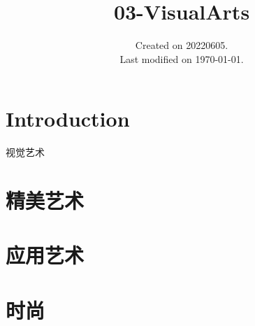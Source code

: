 \documentclass[UTF8]{../RepresentationUniverse}
\begin{document}
\title{03-VisualArts}
\date{Created on 20220605.\\   Last modified on \today.}
\maketitle
\tableofcontents


\chapter{Introduction}
视觉艺术


\chapter{精美艺术}

\chapter{应用艺术}

\chapter{时尚}
\end{document}
